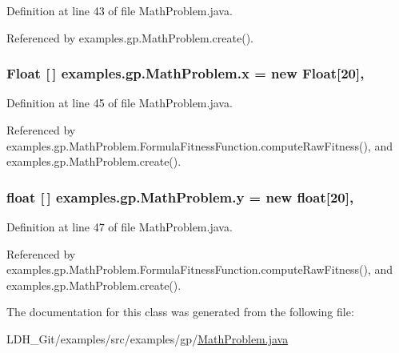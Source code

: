 Definition at line 43 of file Math\-Problem.\-java.



Referenced by examples.\-gp.\-Math\-Problem.\-create().

\hypertarget{classexamples_1_1gp_1_1_math_problem_a3d13d7836d2208696826f96bf7aa4f38}{
\subsubsection[{x}]{\setlength{\rightskip}{0pt plus 5cm}Float \mbox{[}$\,$\mbox{]} examples.\-gp.\-Math\-Problem.\-x = new Float\mbox{[}20\mbox{]}\hspace{0.3cm}{\ttfamily [static]}, {\ttfamily [protected]}}}\label{classexamples_1_1gp_1_1_math_problem_a3d13d7836d2208696826f96bf7aa4f38}


Definition at line 45 of file Math\-Problem.\-java.



Referenced by examples.\-gp.\-Math\-Problem.\-Formula\-Fitness\-Function.\-compute\-Raw\-Fitness(), and examples.\-gp.\-Math\-Problem.\-create().

\hypertarget{classexamples_1_1gp_1_1_math_problem_af6704afaefd4856330b42566157f5905}{
\subsubsection[{y}]{\setlength{\rightskip}{0pt plus 5cm}float \mbox{[}$\,$\mbox{]} examples.\-gp.\-Math\-Problem.\-y = new float\mbox{[}20\mbox{]}\hspace{0.3cm}{\ttfamily [static]}, {\ttfamily [protected]}}}\label{classexamples_1_1gp_1_1_math_problem_af6704afaefd4856330b42566157f5905}


Definition at line 47 of file Math\-Problem.\-java.



Referenced by examples.\-gp.\-Math\-Problem.\-Formula\-Fitness\-Function.\-compute\-Raw\-Fitness(), and examples.\-gp.\-Math\-Problem.\-create().



The documentation for this class was generated from the following file\-:\begin{DoxyCompactItemize}
\item 
L\-D\-H\-\_\-\-Git/examples/src/examples/gp/\hyperlink{_math_problem_8java}{Math\-Problem.\-java}\end{DoxyCompactItemize}
